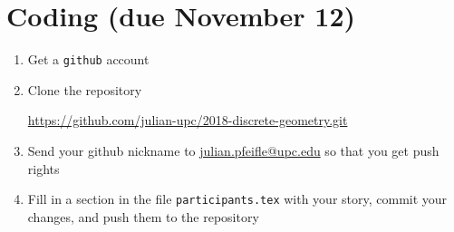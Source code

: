 \documentclass[11pt]{amsart}
\begin{document}
\bigskip
\bigskip
\section*{Coding (due November 12)}
\begin{enumerate}
\item Get a \texttt{github} account
\item Clone the repository
  \begin{center}
    \url{https://github.com/julian-upc/2018-discrete-geometry.git}
  \end{center}

\item Send your github nickname to \url{julian.pfeifle@upc.edu} so that you get push rights

\item Fill in a section in the file \texttt{participants.tex} with your story, commit your changes, and push them to the repository

\end{enumerate}
\end{document}
